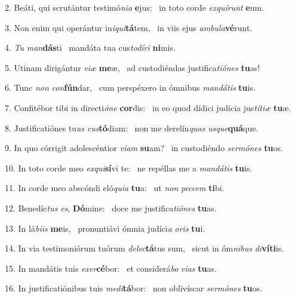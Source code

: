 2. Beáti, qui scrutántur testimó\textit{ni}\textit{a} \textbf{e}jus: \ast\  in toto corde \textit{ex}\textit{quí}\textit{runt} \textbf{e}um.\

3. Non enim qui operántur in\textit{i}\textit{qui}\textbf{tá}tem, \ast\  in viis ejus \textit{am}\textit{bu}\textit{la}\textbf{vé}runt.\

4. \textit{Tu} \textit{man}\textbf{dás}ti \ast\  mandáta tua cus\textit{to}\textit{dí}\textit{ri} \textbf{ni}mis.\

5. Utinam dirigántur \textit{vi}\textit{æ} \textbf{me}æ, \ast\  ad custodiéndas justifica\textit{ti}\textit{ó}\textit{nes} \textbf{tu}as!\

6. Tunc \textit{non} \textit{con}\textbf{fún}dar, \ast\  cum perspéxero in ómnibus \textit{man}\textit{dá}\textit{tis} \textbf{tu}is.\

7. Confitébor tibi in directi\textit{ó}\textit{ne} \textbf{cor}dis: \ast\  in eo quod dídici judícia jus\textit{tí}\textit{ti}\textit{æ} \textbf{tu}æ.\

8. Justificatiónes tu\textit{as} \textit{cus}\textbf{tó}diam: \ast\  non me derelín\textit{quas} \textit{us}\textit{que}\textbf{quá}que.\

9. In quo córrigit adolescéntior \textit{vi}\textit{am} \textbf{su}am? \ast\  in custodiéndo \textit{ser}\textit{mó}\textit{nes} \textbf{tu}os.\

10. In toto corde meo \textit{ex}\textit{qui}\textbf{sí}vi te: \ast\  ne repéllas me a \textit{man}\textit{dá}\textit{tis} \textbf{tu}is.\

11. In corde meo abscóndi eló\textit{qui}\textit{a} \textbf{tu}a: \ast\  ut \textit{non} \textit{pec}\textit{cem} \textbf{ti}bi.\

12. Benedíc\textit{tus} \textit{es}, \textbf{Dó}mine: \ast\  doce me justifica\textit{ti}\textit{ó}\textit{nes} \textbf{tu}as.\

13. In lá\textit{bi}\textit{is} \textbf{me}is, \ast\  pronuntiávi ómnia judíci\textit{a} \textit{o}\textit{ris} \textbf{tu}i.\

14. In via testimoniórum tuórum \textit{de}\textit{lec}\textbf{tá}tus sum, \ast\  sicut in óm\textit{ni}\textit{bus} \textit{di}\textbf{ví}\textbf{ti}is.\

15. In mandátis tuis \textit{ex}\textit{er}\textbf{cé}bor: \ast\  et considerá\textit{bo} \textit{vi}\textit{as} \textbf{tu}as.\

16. In justificatiónibus tuis \textit{me}\textit{di}\textbf{tá}bor: \ast\  non oblivíscar \textit{ser}\textit{mó}\textit{nes} \textbf{tu}os.\

